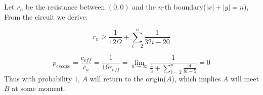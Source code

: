 \documentclass[paper=a4, fontsize=11pt]{scrartcl} %
\numberwithin{equation}{section} %
\numberwithin{figure}{section} %
\numberwithin{table}{section} %
\begin{document}
Let $r_n$ be the resistance between $(0, 0)$ and the $n$-th boundary($|x| + |y| = n$), From the circuit we derive:

$$r_{n} \geq \frac{1}{12\Omega} + \sum_{i=2}^{n} \frac{1}{32i-20} $$ 

$$p_{escape} = \frac{c_{eff}}{c_a} = \frac{1}{16r_{eff}} = \lim_{n\to\infty}\frac{1}{\frac{4}{3} + \sum\limits_{i=2}^{n}\frac{4}{8i-5}} = 0$$
Thus with probability $1$, $A$ will return to the origin($A$), which implies $A$ will meet $B$ at some moment.
\end{document}
